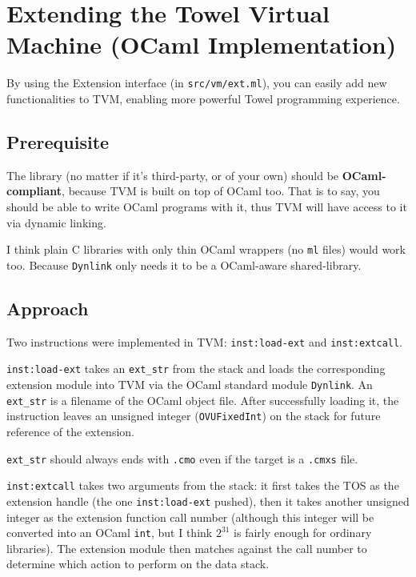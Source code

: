 \documentclass{report}
\newcommand{\inst}[1] {\texttt{inst:#1}}
\begin{document}
\chapter{Extending the Towel Virtual Machine (OCaml Implementation)}

By using the Extension interface (in \texttt{src/vm/ext.ml}), you can easily add new functionalities to TVM, enabling more powerful Towel programming experience.

\section{Prerequisite}

The library (no matter if it's third-party, or of your own) should be \textbf{OCaml-compliant}, because TVM is built on top of OCaml too. That is to say, you should be able to write OCaml programs with it, thus TVM will have access to it via dynamic linking.

\begin{mdframed}[style=hint]
  I think plain C libraries with only thin OCaml wrappers (no
  \texttt{ml} files) would work too. Because \texttt{Dynlink} only
  needs it to be a OCaml-aware shared-library.
\end{mdframed}

\section{Approach}

Two instructions were implemented in TVM: \inst{load-ext} and \inst{extcall}.

\inst{load-ext} takes an \texttt{ext\_str} from the stack and loads the corresponding extension module into TVM via the OCaml standard module \texttt{Dynlink}. An \texttt{ext\_str} is a filename of the OCaml object file. After successfully loading it, the instruction leaves an unsigned integer (\texttt{OVUFixedInt}) on the stack for future reference of the extension.

\begin{mdframed}[style=hint]
   \texttt{ext\_str} should always ends with \texttt{.cmo} even if the target is a \texttt{.cmxs} file.
\end{mdframed}

\inst{extcall} takes two arguments from the stack: it first takes the TOS as the extension handle (the one \inst{load-ext} pushed), then it takes another unsigned integer as the extension function call number (although this integer will be converted into an OCaml \texttt{int}, but I think $2^{31}$ is fairly enough for ordinary libraries). The extension module then matches against the call number to determine which action to perform on the data stack.
\end{document}
